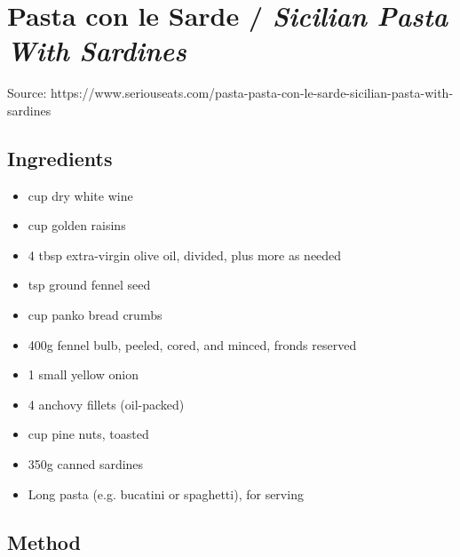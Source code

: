 \section{Pasta con le Sarde / \emph{Sicilian Pasta With Sardines}}


Source: https://www.seriouseats.com/pasta-pasta-con-le-sarde-sicilian-pasta-with-sardines

\subsection{Ingredients}

\begin{itemize}
    \item {} cup dry white wine
    \item {} cup golden raisins
    \item 4 tbsp extra-virgin olive oil, divided, plus more as needed
    \item {} tsp ground fennel seed
    \item {} cup panko bread crumbs
    \item 400g fennel bulb, peeled, cored, and minced, fronds reserved
    \item 1 small yellow onion
    \item 4 anchovy fillets (oil-packed)
    \item {} cup pine nuts, toasted
    \item 350g canned sardines
    \item Long pasta (e.g. bucatini or spaghetti), for serving
\end{itemize}

\subsection{Method}

